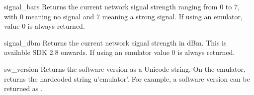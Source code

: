 \begin{funcdesc}{signal_bars}{}
Returns the current network signal strength ranging from 0 to 7, with 0 
meaning no signal and 7 meaning a strong signal. If using an emulator, value 
0 is always returned. 
\end{funcdesc}

\begin{funcdesc}{signal_dbm}{}
Returns the current network signal strength in dBm. This is available SDK 2.8
onwards. If using an emulator value 0 is always returned. 
\end{funcdesc}


\begin{funcdesc}{sw_version}{}
Returns the software version as a Unicode string. On the emulator,
returns the hardcoded string \textsf{u'emulator'}. For example, a
software version can be returned as .
\end{funcdesc}
